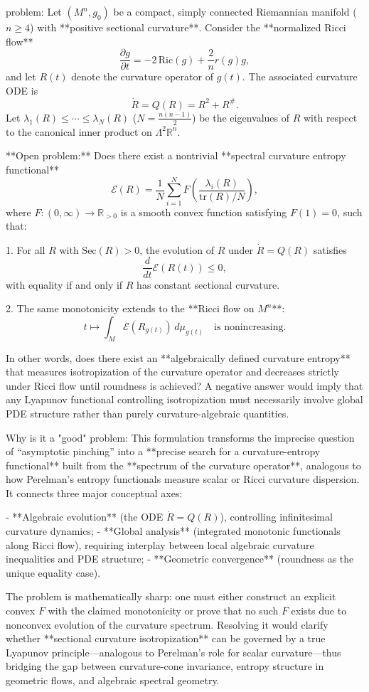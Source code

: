 problem:  
Let \( (M^n, g_0) \) be a compact, simply connected Riemannian manifold (\(n \ge 4\)) with **positive sectional curvature**.  Consider the **normalized Ricci flow**
\[
\frac{\partial g}{\partial t} = -2\,\mathrm{Ric}(g) + \frac{2}{n}r(g)g,
\]
and let \(R(t)\) denote the curvature operator of \(g(t)\).  The associated curvature ODE is
\[
\dot{R} = Q(R) = R^2 + R^{\#}.
\]
Let \(\lambda_1(R)\le \cdots \le \lambda_N(R)\) (\(N=\tfrac{n(n-1)}{2}\)) be the eigenvalues of \(R\) with respect to the canonical inner product on \(\Lambda^2\mathbb{R}^n\).

**Open problem:**  
Does there exist a nontrivial **spectral curvature entropy functional**
\[
\mathcal{E}(R) = \frac{1}{N}\sum_{i=1}^N F\!\left(\frac{\lambda_i(R)}{\mathrm{tr}(R)/N}\right),
\]
where \(F:(0,\infty)\to\mathbb{R}_{>0}\) is a smooth convex function satisfying \(F(1)=0\), such that:

1. For all \(R\) with \(\mathrm{Sec}(R)>0\), the evolution of \(R\) under \(\dot{R}=Q(R)\) satisfies
   \[
   \frac{d}{dt}\mathcal{E}(R(t)) \le 0,
   \]
   with equality if and only if \(R\) has constant sectional curvature.

2. The same monotonicity extends to the **Ricci flow on \(M^n\)**:
   \[
   t \mapsto \int_M \mathcal{E}(R_{g(t)})\,d\mu_{g(t)}
   \quad\text{is nonincreasing.}
   \]

In other words, does there exist an **algebraically defined curvature entropy** that measures isotropization of the curvature operator and decreases strictly under Ricci flow until roundness is achieved?  
A negative answer would imply that any Lyapunov functional controlling isotropization must necessarily involve global PDE structure rather than purely curvature-algebraic quantities.

Why is it a "good" problem:  
This formulation transforms the imprecise question of “asymptotic pinching” into a **precise search for a curvature-entropy functional** built from the **spectrum of the curvature operator**, analogous to how Perelman’s entropy functionals measure scalar or Ricci curvature dispersion.  It connects three major conceptual axes:  

- **Algebraic evolution** (the ODE \(\dot{R}=Q(R)\)), controlling infinitesimal curvature dynamics;  
- **Global analysis** (integrated monotonic functionals along Ricci flow), requiring interplay between local algebraic curvature inequalities and PDE structure;  
- **Geometric convergence** (roundness as the unique equality case).

The problem is mathematically sharp: one must either construct an explicit convex \(F\) with the claimed monotonicity or prove that no such \(F\) exists due to nonconvex evolution of the curvature spectrum.  Resolving it would clarify whether **sectional curvature isotropization** can be governed by a true Lyapunov principle—analogous to Perelman’s role for scalar curvature—thus bridging the gap between curvature-cone invariance, entropy structure in geometric flows, and algebraic spectral geometry.